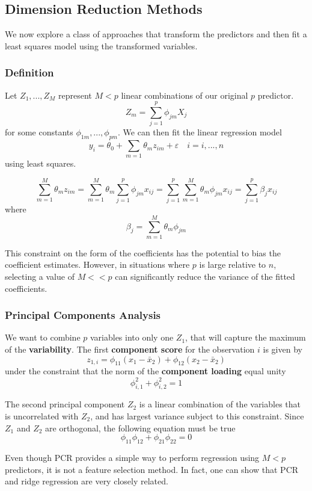 \subsection{Dimension Reduction Methods}
We now explore a class of approaches that transform the predictors and then fit a least squares model using the transformed variables.

\subsubsection{Definition}
Let $Z_1,...,Z_M$ represent $M<p$ linear combinations of our original $p$ predictor.
\[ Z_m = \sum_{j=1}^p \phi_{jm} X_j \]
for some constants $\phi_{1m},...,\phi_{pm}$. We can then fit the linear regression model
\[ y_i = \theta_0 + \sum_{m=1} \theta_m z_{im} + \varepsilon \quad i=i,...,n \]
using least squares.
\begin{note}
    \[ \sum_{m=1}^{M} \theta_{m} z_{i m}=\sum_{m=1}^{M} \theta_{m} \sum_{j=1}^{p} \phi_{j m} x_{i j}=\sum_{j=1}^{p} \sum_{m=1}^{M} \theta_{m} \phi_{j m} x_{i j}=\sum_{j=1}^{p} \beta_{j} x_{i j} \]
    where 
    \[ \beta_{j}=\sum_{m=1}^{M} \theta_{m} \phi_{j m} \]
\end{note}
This constraint on the form of the coefficients has the potential to bias the coefficient estimates. However, in situations where $p$ is large relative to $n$, selecting a value of $M << p$ can significantly reduce the variance of the fitted coefficients.

\subsubsection{Principal Components Analysis}
We want to combine $p$ variables into only one $Z_1$, that will capture the maximum of the \textbf{variability}. The first \textbf{component score} for the observation $i$ is given by 
\[ z_{1,i} = \phi_{11}(x_1 - \bar{x}_2)  + \phi_{12}(x_2 - \bar{x}_2) \]
under the constraint that the norm of the \textbf{component loading} equal unity
\[ \phi_{i,1}^2 + \phi_{i, 2}^2 = 1 \]

The second principal component $Z_2$ is a linear combination of the variables that is uncorrelated with $Z_2$, and has largest variance subject to this constraint. Since $Z_1$ and $Z_2$ are orthogonal, the following equation must be true
\[ \phi_{11}\phi_{12} + \phi_{21}\phi_{22} = 0 \]

\begin{note}
    Even though PCR provides a simple way to perform regression using $M < p$ predictors, it is not a feature selection method.
    In fact, one can show that PCR and ridge regression are very closely related.
\end{note}
